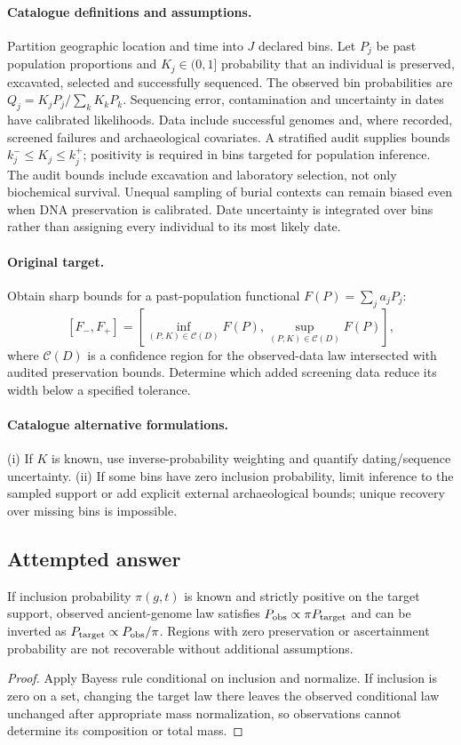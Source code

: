 \documentclass[11pt]{article}
\begin{document}
\paragraph{Catalogue definitions and assumptions.}
Partition geographic location and time into $J$ declared bins. Let $P_j$ be past population proportions and $K_j\in(0,1]$ probability that an individual is preserved, excavated, selected and successfully sequenced. The observed bin probabilities are $Q_j=K_jP_j/\sum_kK_kP_k$. Sequencing error, contamination and uncertainty in dates have calibrated likelihoods. Data include successful genomes and, where recorded, screened failures and archaeological covariates. A stratified audit supplies bounds $k_j^-\le K_j\le k_j^+$; positivity is required in bins targeted for population inference. The audit bounds include excavation and laboratory selection, not only biochemical survival. Unequal sampling of burial contexts can remain biased even when DNA preservation is calibrated. Date uncertainty is integrated over bins rather than assigning every individual to its most likely date.
\paragraph{Original target.}
Obtain sharp bounds for a past-population functional $F(P)=\sum_j a_jP_j$:
\[
 [F_-,F_+]=
 \left[\inf_{(P,K)\in\mathcal C(D)}F(P),
       \sup_{(P,K)\in\mathcal C(D)}F(P)\right],
\]
where $\mathcal C(D)$ is a confidence region for the observed-data law intersected with audited preservation bounds. Determine which added screening data reduce its width below a specified tolerance.
\paragraph{Catalogue alternative formulations.}
(i) If $K$ is known, use inverse-probability weighting and quantify dating/sequence uncertainty. (ii) If some bins have zero inclusion probability, limit inference to the sampled support or add explicit external archaeological bounds; unique recovery over missing bins is impossible.
\subsection{Attempted answer}
\begin{proposition}
If inclusion probability $\pi(g,t)$ is known and strictly positive on the target support, observed ancient-genome law satisfies $P_{\rm obs}\propto\pi P_{\rm target}$ and can be inverted as $P_{\rm target}\propto P_{\rm obs}/\pi$. Regions with zero preservation or ascertainment probability are not recoverable without additional assumptions.
\end{proposition}
\begin{proof}
Apply Bayes\textquotesingle s rule conditional on inclusion and normalize. If inclusion is zero on a set, changing the target law there leaves the observed conditional law unchanged after appropriate mass normalization, so observations cannot determine its composition or total mass.
\end{proof}
\end{document}
